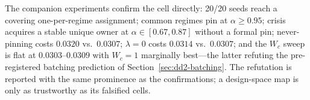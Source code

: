 \begin{remark}
The companion experiments confirm the \nm{} cell directly: 20/20 seeds reach
a covering one-per-regime assignment; common regimes pin at
$\alpha \ge 0.95$; crisis acquires a stable unique owner at
$\alpha \in [0.67, 0.87]$ without a formal pin; never-pinning costs $0.0320$
vs.\ $0.0307$; $\lambda = 0$ costs $0.0314$ vs.\ $0.0307$; and the $W_c$
sweep is flat at $0.0303$--$0.0309$ with $W_c = 1$ marginally best---the
latter refuting the pre-registered batching prediction of
Section~\ref{sec:dd2-batching}. The refutation is reported with the same
prominence as the confirmations; a design-space map is only as trustworthy
as its falsified cells.
\end{remark}
